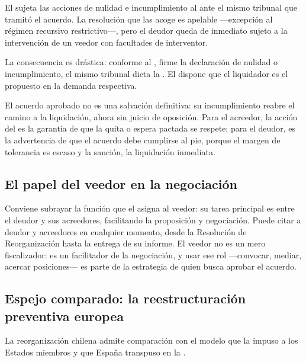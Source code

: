 El  sujeta las acciones de nulidad e incumplimiento al  ante el
mismo tribunal que tramitó el acuerdo. La resolución que las acoge es apelable  ---excepción al régimen recursivo restrictivo---, pero el deudor queda de inmediato
sujeto a la intervención de un veedor con facultades de interventor.

La consecuencia es drástica: conforme al , firme la declaración de nulidad o
incumplimiento, el mismo tribunal dicta la . El  dispone que el liquidador es el propuesto en la demanda respectiva.

\begin{foco}
El acuerdo aprobado no es una salvación definitiva: su incumplimiento reabre el camino a la
liquidación, ahora sin juicio de oposición. Para el acreedor, la acción del  es la
garantía de que la quita o espera pactada se respete; para el deudor, es la advertencia de que
el acuerdo debe cumplirse al pie, porque el margen de tolerancia es escaso y la sanción, la
liquidación inmediata.
\end{foco}

\subsection{El papel del veedor en la negociación}

Conviene subrayar la función que el  asigna al veedor: su tarea principal es
 entre el deudor y sus acreedores, facilitando la proposición y
negociación. Puede citar a deudor y acreedores en cualquier momento, desde la Resolución de
Reorganización hasta la entrega de su informe. El veedor no es un mero fiscalizador: es un
facilitador de la negociación, y usar ese rol ---convocar, mediar, acercar posiciones--- es parte
de la estrategia de quien busca aprobar el acuerdo.

\subsection{Espejo comparado: la reestructuración preventiva europea}

La reorganización chilena admite comparación con el modelo que la  \parencite{ue-directiva-2019-1023} impuso a los Estados miembros y que España
transpuso en la  \parencite{esp-ley16-2022}.


